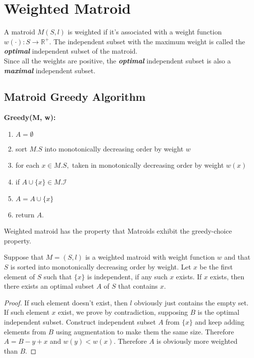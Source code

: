 \documentclass[12pt]{article}
\newenvironment{lemma}[2][Lemma]{\begin{trivlist}
		\item[\hskip \labelsep {\bfseries #1}\hskip \labelsep {\bfseries #2.}]}{\end{trivlist}}
\begin{document}
	\section{Weighted Matroid}
	A matroid $M(S, l)$ is weighted if it's associated with a weight function $w(\cdot): S \to \mathbb{R}^{+}$. The independent subset with the maximum weight is called the \textbf{\textit{optimal}} independent subset of the matroid. \\
	\newline
	Since all the weights are positive, the \textbf{\textit{optimal}} independent subset is also a \textbf{\textit{maximal}} independent subset.
	\subsection{Matroid Greedy Algorithm}
	\textbf{Greedy(M, w):}
	\begin{enumerate}
		\item $A = \emptyset$
		\item sort $M . S$ into monotonically decreasing order by weight $w$
		\item for each $x \in M . S ,$ taken in monotonically decreasing order by weight $w ( x )$
		\item \quad if $A \cup \{ x \} \in M . \mathcal { I }$
		\item \qquad $A = A \cup \{ x \}$
		\item return $A$.
	\end{enumerate}
	Weighted matroid has the property that Matroids exhibit the greedy-choice property.
	\begin{lemma}{1}
		Suppose that $M = (S, l)$ is a weighted matroid with weight function $w$ and that $S$
		is sorted into monotonically decreasing order by weight. Let $x$ be the first element
		of $S$ such that $\{x\}$ is independent, if any such $x$ exists. If $x$ exists, then there exists
		an optimal subset $A$ of $S$ that contains $x$.
	\end{lemma}
	\begin{proof}
		If such element doesn't exist, then $l$ obviously just contains the empty set.\\
		\newline
		If such element $x$ exist, we prove by contradiction, supposing $B$ is the optimal independent subset. Construct independent subset $A$ from $\{x\}$ and keep adding elements from $B$ using augmentation to make them the same size. Therefore $A = B - {y} + {x}$ and  $w(y) < w(x)$. Therefore $A$ is obviously more weighted than $B$.
	\end{proof}
	
\end{document}
